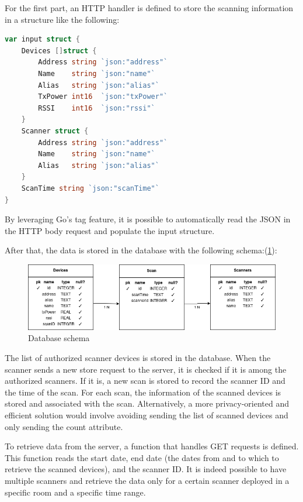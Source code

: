 \documentclass[a4paper, 11pt]{article}
\begin{document}
For the first part, an HTTP handler is defined to store the scanning information in a structure like the following:

\begin{lstlisting}[language=Go]
var input struct {
	Devices []struct {
		Address string `json:"address"`
		Name    string `json:"name"`
		Alias   string `json:"alias"`
		TxPower int16  `json:"txPower"`
		RSSI    int16  `json:"rssi"`
	}
	Scanner struct {
		Address string `json:"address"`
		Name    string `json:"name"`
		Alias   string `json:"alias"`
	}
	ScanTime string `json:"scanTime"`
}
\end{lstlisting}

By leveraging Go's tag feature, it is possible to automatically read the JSON in the HTTP body request and populate the input structure.

After that, the data is stored in the database with the following schema:(\ref{fig:database-schema}):

\begin{figure}
    \centering
    \includegraphics[width=1\linewidth]{images/WNMA_DB.drawio}
    \caption{Database schema}
    \label{fig:database-schema}
\end{figure}

The list of authorized scanner devices is stored in the database. When the scanner sends a new store request to the server, it is checked if it is among the authorized scanners. If it is, a new scan is stored to record the scanner ID and the time of the scan. For each scan, the information of the scanned devices is stored and associated with the scan. Alternatively, a more privacy-oriented and efficient solution would involve avoiding sending the list of scanned devices and only sending the count attribute.

To retrieve data from the server, a function that handles GET requests is defined. This function reads the start date, end date (the dates from and to which to retrieve the scanned devices), and the scanner ID. It is indeed possible to have multiple scanners and retrieve the data only for a certain scanner deployed in a specific room and a specific time range.
\end{document}
